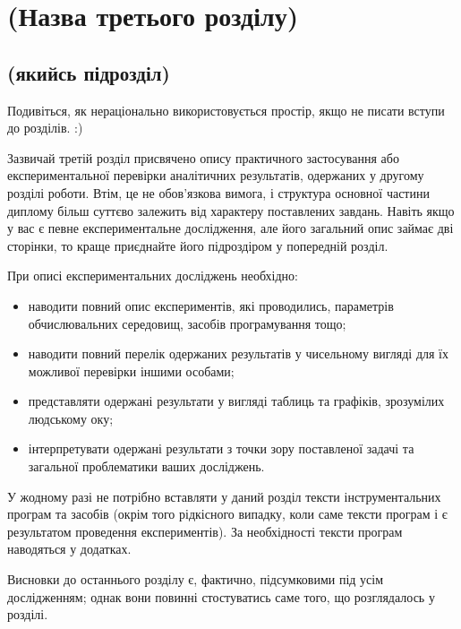 \chapter{(Назва третього розділу)}
\label{chap:practice}

\section{(якийсь підрозділ)}

Подивіться, як нераціонально використовується простір, якщо не писати
вступи до розділів. :)

Зазвичай третій розділ присвячено опису практичного застосування або
експериментальної перевірки аналітичних результатів, одержаних у другому
розділі роботи. Втім, це не обов'язкова вимога, і структура основної
частини диплому більш суттєво залежить від характеру поставлених завдань.
Навіть якщо у вас є певне експериментальне дослідження, але його загальний
опис займає дві сторінки, то краще приєднайте його підроздіром у
попередній розділ.

При описі експериментальних досліджень необхідно:

\begin{itemize}
    \item наводити повний опис експериментів, які проводились, параметрів
          обчислювальних середовищ, засобів програмування тощо;
    \item наводити повний перелік одержаних результатів у чисельному вигляді для їх можливої
          перевірки іншими особами;
    \item представляти одержані результати у вигляді таблиць та графіків,
          зрозумілих людському оку;
    \item інтерпретувати одержані результати з точки зору поставленої задачі
          та загальної проблематики ваших досліджень.
\end{itemize}

У жодному разі не потрібно вставляти у даний розділ тексти
інструментальних програм та засобів (окрім того рідкісного випадку, коли
саме тексти програм і є результатом проведення експериментів). За
необхідності тексти програм наводяться у додатках.

\chapconclude{\ref{chap:practice}}

Висновки до останнього розділу є, фактично, підсумковими під усім
дослідженням; однак вони повинні стостуватись саме того, що розглядалось у
розділі.